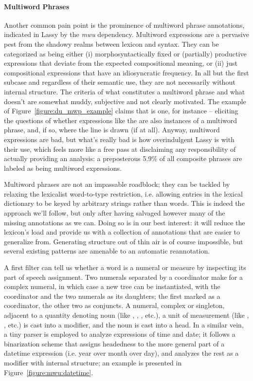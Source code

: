 \paragraph{Multiword Phrases}
Another common pain point is the prominence of multiword phrase annotations, indicated in Lassy by the \textit{mwu} dependency.
Multiword expressions are a pervasive pest from the shadowy realms between lexicon and syntax.
They can be categorized as being either (i) morphosyntactically fixed or (partially) productive expressions that deviate from the expected compositional meaning, or (ii) just compositional expressions that have an idiosyncratic frequency.
In all but the first subcase and regardless of their semantic use, they are not necessarily without internal structure.
The criteria of what constitutes a multiword phrase and what doesn't are somewhat muddy, subjective and not clearly motivated.
The example of Figure~\ref{figure:du_mwp_example} claims that  is one, for instance -- eliciting the questions of whether expressions like the  are also instances of a multiword phrase, and, if so, where the line is drawn (if at all).
Anyway, multiword expressions are bad, but what's really bad is how overindulgent Lassy is with their use, which feels more like a free pass at disclaiming any responsibility of actually providing an analysis: a preposterous 5.9\% of all composite phrases are labeled as being multiword expressions.

Multiword phrases are not an impassable roadblock; they can be tackled by relaxing the lexicalist word-to-type restriction, i.e. allowing entries in the lexical dictionary to be keyed by arbitrary strings rather than words.
This is indeed the approach we'll follow, but only after having salvaged however many of the missing annotations as we can.
Doing so is in our best interest: it will reduce the lexicon's load and provide us with a collection of annotations that are easier to generalize from.
Generating structure out of thin air is of course impossible, but several existing patterns are amenable to an automatic reannotation.

A first filter can tell us whether a word is a numeral or measure by inspecting its part of speech assignment.
Two numerals separated by a coordinator make for a complex numeral, in which case a new tree can be instantiated, with the coordinator and the two numerals as its daughters; the first marked as a coordinator, the other two as conjuncts.
A numeral, complex or singleton, adjacent to a quantity denoting noun (like , , , etc.), a unit of measurement (like , , etc.) is cast into a modifier, and the noun is cast into a head.
In a similar vein, a tiny parser is employed to analyze expressions of time and date; it follows a binarization scheme that assigns headedness to the more general part of a datetime expression (i.e. year over month over day), and analyzes the rest as a modifier with internal structure; an example is presented in Figure~\ref{figure:mwu:datetime}.

